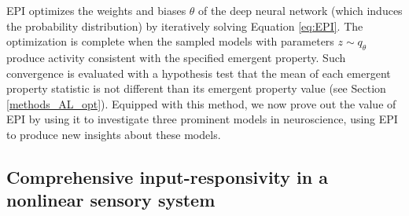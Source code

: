 \documentclass[11pt]{article}
\begin{document}
EPI optimizes the weights and biases $\theta$ of the deep neural network (which induces the probability distribution) by iteratively solving Equation \ref{eq:EPI}. 
The optimization is complete when the sampled models with parameters $z \sim q_\theta$ produce activity consistent with the specified emergent property.  
Such convergence is evaluated with a hypothesis test that the mean of each emergent property statistic is not different than its emergent property value (see Section \ref{methods_AL_opt}). 
Equipped with this method, we now prove out the value of EPI by using it to investigate three prominent models in neuroscience, using EPI to produce new insights about these models.


\subsection{Comprehensive input-responsivity in a nonlinear sensory system} \label{results_V1}
\end{document}
